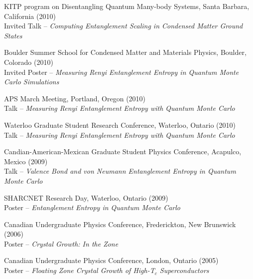 \documentclass[letterpaper]{article}
\renewenvironment{itemize}{
  \begin{list}{}{
    \setlength{\leftmargin}{1.5em}
  }
}{
  \end{list}
}
\begin{document}
\begin{itemize}
\item KITP program on Disentangling Quantum Many-body Systems, Santa Barbara, California (2010) \\
 	Invited Talk -- {\it Computing Entanglement Scaling in Condensed Matter Ground States}
\item Boulder Summer School for Condensed Matter and Materials Physics, Boulder, Colorado (2010)\\
	Invited Poster -- {\it Measuring Renyi Entanglement Entropy in Quantum Monte Carlo Simulations}
\item APS March Meeting, Portland, Oregon (2010) \\
	Talk --  {\it Measuring Renyi Entanglement Entropy with Quantum Monte Carlo}
\item Waterloo Graduate Student Research Conference, Waterloo, Ontario (2010) \\
	Talk --  {\it Measuring Renyi Entanglement Entropy with Quantum Monte Carlo}
\item Candian-American-Mexican Graduate Student Physics Conference, Acapulco, Mexico (2009) \\
	Talk --  {\it Valence Bond and von Neumann Entanglement Entropy in Quantum Monte Carlo}
\item SHARCNET Research Day, Waterloo, Ontario (2009)  \\
	Poster -- {\it Entanglement Entropy in Quantum Monte Carlo}
\item Canadian Undergraduate Physics Conference, Frederickton, New Brunswick (2006)\\
	Poster -- {\it Crystal Growth: In the Zone}
\item Canadian Undergraduate Physics Conference, London, Ontario (2005)\\
	Poster -- {\it Floating Zone Crystal Growth of High-T$_c$ Superconductors}
\end{itemize}

\end{document}
